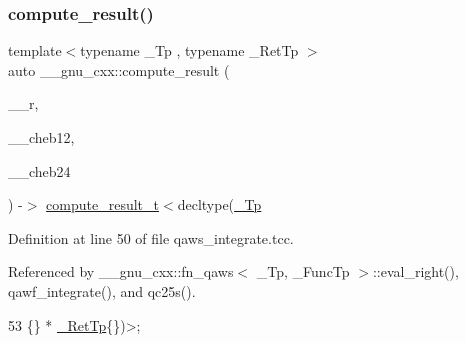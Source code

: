 \subsubsection{\texorpdfstring{compute\+\_\+result()}{compute\_result()}}
{\footnotesize\ttfamily template$<$typename \+\_\+\+Tp , typename \+\_\+\+Ret\+Tp $>$ \\
auto \+\_\+\+\_\+gnu\+\_\+cxx\+::compute\+\_\+result (\begin{DoxyParamCaption}\item[{const std\+::array$<$ \hyperlink{namespace____gnu__cxx_a3b19a9c800ca194374ef9172290f7d79}{\+\_\+\+Tp}, 25 $>$ \&}]{\+\_\+\+\_\+r,  }\item[{const std\+::array$<$ \hyperlink{namespace____gnu__cxx_a886e03ece3d53ff7fa6c098a40f93fa5}{\+\_\+\+Ret\+Tp}, 13 $>$ \&}]{\+\_\+\+\_\+cheb12,  }\item[{const std\+::array$<$ \hyperlink{namespace____gnu__cxx_a886e03ece3d53ff7fa6c098a40f93fa5}{\+\_\+\+Ret\+Tp}, 25 $>$ \&}]{\+\_\+\+\_\+cheb24 }\end{DoxyParamCaption}) -\/$>$ \hyperlink{struct____gnu__cxx_1_1compute__result__t}{compute\+\_\+result\+\_\+t}$<$decltype(\hyperlink{namespace____gnu__cxx_a3b19a9c800ca194374ef9172290f7d79}{\+\_\+\+Tp}}



Definition at line 50 of file qaws\+\_\+integrate.\+tcc.



Referenced by \+\_\+\+\_\+gnu\+\_\+cxx\+::fn\+\_\+qaws$<$ \+\_\+\+Tp, \+\_\+\+Func\+Tp $>$\+::eval\+\_\+right(), qawf\+\_\+integrate(), and qc25s().


\begin{DoxyCode}
53                                     \{\} * \hyperlink{namespace____gnu__cxx_a886e03ece3d53ff7fa6c098a40f93fa5}{\_RetTp}\{\})>;
\end{DoxyCode}
\mbox{\label{namespace____gnu__cxx_a569f7c4b604e9539bddd25996c5e67b6}} 
